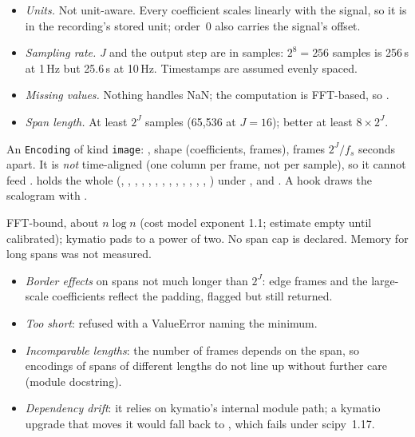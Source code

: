 \begin{itemize}
\item \emph{Units.} Not unit-aware. Every coefficient scales linearly with the signal, so it is
  in the recording's stored unit; order~0 also carries the signal's offset.
\item \emph{Sampling rate.} \emph{J} and the output step are in samples: $2^8 = 256$ samples is
  256\,s at 1\,Hz but 25.6\,s at 10\,Hz. Timestamps are assumed evenly spaced.
\item \emph{Missing values.} Nothing handles NaN; the computation is FFT-based, so
  .
\item \emph{Span length.} At least $2^J$ samples (65{,}536 at $J = 16$); better at least
  $8\times2^J$.
\end{itemize}

An \texttt{Encoding} of kind \texttt{image}: , shape (coefficients, frames), frames
$2^J/f_s$ seconds apart. It is \emph{not} time-aligned (one column per frame, not per sample),
so it cannot feed .  holds the whole
 (, , , ,
, , , , , , ,
, , ) under
, and . A  hook draws the
scalogram with .

FFT-bound, about $n\log n$ (cost model exponent 1.1; estimate empty until calibrated); kymatio
pads to a power of two. No span cap is declared. Memory for long spans was not measured.

\begin{itemize}
\item \emph{Border effects} on spans not much longer than $2^J$: edge frames and the
  large-scale coefficients reflect the padding, flagged but still returned.
\item \emph{Too short}: refused with a ValueError naming the minimum.
\item \emph{Incomparable lengths}: the number of frames depends on the span, so encodings of
  spans of different lengths do not line up without further care (module docstring).
\item \emph{Dependency drift}: it relies on kymatio's internal module path; a kymatio upgrade
  that moves it would fall back to , which fails under scipy~1.17.
\end{itemize}

